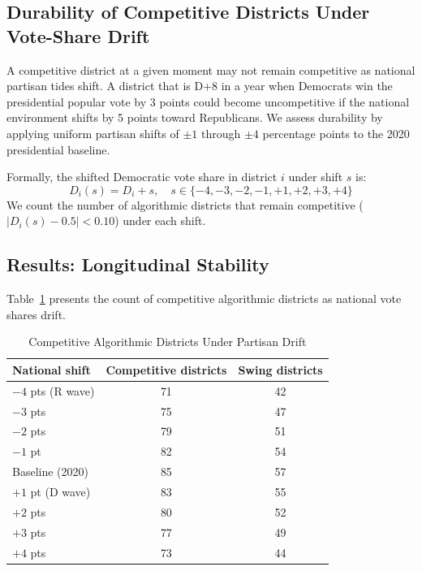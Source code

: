\label{sec:longitudinal}

\subsection{Durability of Competitive Districts Under Vote-Share Drift}

A competitive district at a given moment may not remain competitive as
national partisan tides shift.  A district that is D+8 in a year when
Democrats win the presidential popular vote by 3 points could become
uncompetitive if the national environment shifts by 5 points toward
Republicans.  We assess durability by applying uniform partisan shifts of
$\pm 1$ through $\pm 4$ percentage points to the 2020 presidential baseline.

Formally, the shifted Democratic vote share in district $i$ under shift $s$ is:
\begin{equation}
  D_i(s) = D_i + s, \quad s \in \{-4, -3, -2, -1, +1, +2, +3, +4\}
\end{equation}
We count the number of algorithmic districts that remain competitive
($|D_i(s) - 0.5| < 0.10$) under each shift.

\subsection{Results: Longitudinal Stability}

Table~\ref{tab:longitudinal} presents the count of competitive algorithmic
districts as national vote shares drift.

\begin{table}[h]
\centering
\caption{Competitive Algorithmic Districts Under Partisan Drift}
\label{tab:longitudinal}
\begin{tabular}{lcc}
\toprule
National shift & Competitive districts & Swing districts \\
\midrule
$-4$ pts (R wave) & 71 & 42 \\
$-3$ pts & 75 & 47 \\
$-2$ pts & 79 & 51 \\
$-1$ pt & 82 & 54 \\
Baseline (2020) & 85 & 57 \\
$+1$ pt (D wave) & 83 & 55 \\
$+2$ pts & 80 & 52 \\
$+3$ pts & 77 & 49 \\
$+4$ pts & 73 & 44 \\
\bottomrule
\end{tabular}
\end{table}

